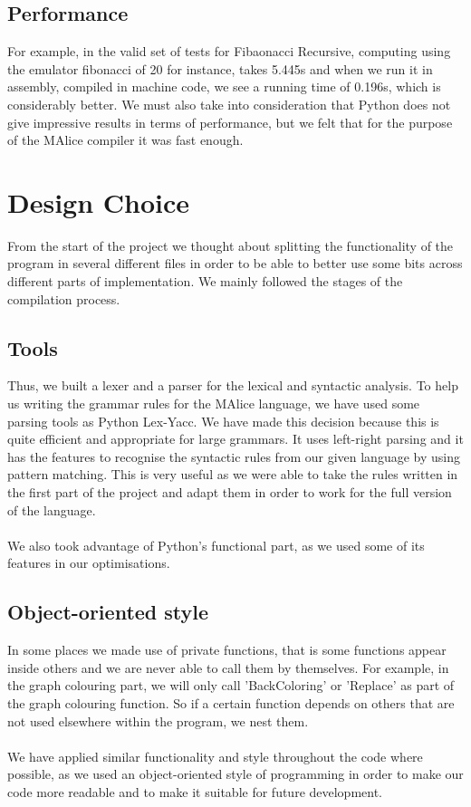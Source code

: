 \documentclass[a4wide, 11pt]{article}
\begin{document}
\subsection{Performance}
For example, in the valid set of tests for Fibaonacci Recursive, computing using the emulator fibonacci of 20 for instance, takes 5.445s and when we run it in assembly, compiled in machine code, we see a running time of 0.196s, which is considerably better. We must also take into consideration that Python does not give impressive results in terms of performance, but we felt that for the purpose of the MAlice compiler it was fast enough.

\section{Design Choice}
From the start of the project we thought about splitting the functionality of the program in several different files in order to be able to better use some bits across different parts of implementation. We mainly followed the stages of the compilation process. 

\subsection{Tools}
Thus, we built a lexer and a parser for the lexical and syntactic analysis. To help us writing the grammar rules for the MAlice language, we have used some parsing tools as Python Lex-Yacc. We have made this decision because this is quite efficient and appropriate for large grammars. It uses left-right parsing and it has the features to recognise the syntactic rules from our given language by using pattern matching. This is very useful as we were able to take the rules written in the first part of the project and adapt them in order to work for the full version of the language.
\\\\
We also took advantage of Python's functional part, as we used some of its features in our optimisations.

\subsection{Object-oriented style}
In some places we made use of private functions, that is some functions appear inside others and we are never able to call them by themselves. For example, in the graph colouring part, we will only call 'BackColoring' or 'Replace' as part of the graph colouring function. So if a certain function depends on others that are not used elsewhere within the program, we nest them.
\\\\
We have applied similar functionality and style  throughout the code where possible, as we used an object-oriented style of programming in order to make our code more readable and to make it suitable for future development. 
\end{document}
